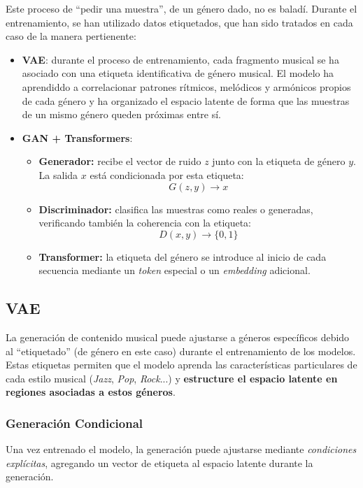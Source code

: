 Este proceso de ``pedir una muestra'', de un género dado, no es baladí. Durante el entrenamiento, se han utilizado datos etiquetados, que han sido tratados en cada caso de la manera pertienente:
\begin{itemize}
    \item \textbf{VAE}: durante el proceso de entrenamiento, cada fragmento musical se ha asociado con una etiqueta identificativa de género musical. El modelo ha aprendiddo a correlacionar patrones rítmicos, melódicos y armónicos propios de cada género y ha organizado el espacio latente de forma que las muestras de un mismo género queden próximas entre sí.
    \item \textbf{GAN + Transformers}:
    \begin{itemize}
        \item \textbf{Generador:} recibe el vector de ruido \( z \) junto con la etiqueta de género \( y \). La salida \( x \) está condicionada por esta etiqueta:
        \[
        G(z, y) \rightarrow x
        \]
        \item \textbf{Discriminador:} clasifica las muestras como reales o generadas, verificando también la coherencia con la etiqueta:
        \[
        D(x, y) \rightarrow \{0, 1\}
        \]
        \item \textbf{Transformer:} la etiqueta del género se introduce al inicio de cada secuencia mediante un \emph{token} especial o un \emph{embedding} adicional.
    \end{itemize}
\end{itemize}

\subsection{VAE}

La generación de contenido musical puede ajustarse a géneros específicos debido al ``etiquetado'' (de género en este caso) durante el entrenamiento de los modelos. Estas etiquetas permiten que el modelo aprenda las características particulares de cada estilo musical (\textit{Jazz}, \textit{Pop}, \textit{Rock}...) y \textbf{estructure el espacio latente en regiones asociadas a estos géneros}.


\subsubsection{Generación Condicional}
Una vez entrenado el modelo, la generación puede ajustarse mediante \textit{condiciones explícitas}, agregando un vector de etiqueta al espacio latente durante la generación.

